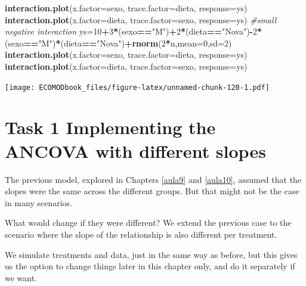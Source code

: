 \documentclass[
]{book}
\newenvironment{Shaded}{\begin{snugshade}}{\end{snugshade}}
\newcommand{\CommentTok}[1]{\textcolor[rgb]{0.56,0.35,0.01}{\textit{#1}}}
\newcommand{\DataTypeTok}[1]{\textcolor[rgb]{0.13,0.29,0.53}{#1}}
\newcommand{\DecValTok}[1]{\textcolor[rgb]{0.00,0.00,0.81}{#1}}
\newcommand{\KeywordTok}[1]{\textcolor[rgb]{0.13,0.29,0.53}{\textbf{#1}}}
\newcommand{\NormalTok}[1]{#1}
\newcommand{\OperatorTok}[1]{\textcolor[rgb]{0.81,0.36,0.00}{\textbf{#1}}}
\newcommand{\StringTok}[1]{\textcolor[rgb]{0.31,0.60,0.02}{#1}}
\begin{document}
\begin{Shaded}
\begin{Highlighting}[]
\KeywordTok{interaction.plot}\NormalTok{(}\DataTypeTok{x.factor=}\NormalTok{sexo, }\DataTypeTok{trace.factor=}\NormalTok{dieta, }\DataTypeTok{response=}\NormalTok{ys)}
\KeywordTok{interaction.plot}\NormalTok{(}\DataTypeTok{x.factor=}\NormalTok{dieta, }\DataTypeTok{trace.factor=}\NormalTok{sexo, }\DataTypeTok{response=}\NormalTok{ys)}
\CommentTok{#small negative interaction}
\NormalTok{ys=}\DecValTok{10}\OperatorTok{+}\DecValTok{3}\OperatorTok{*}\NormalTok{(sexo}\OperatorTok{==}\StringTok{"M"}\NormalTok{)}\OperatorTok{+}\DecValTok{2}\OperatorTok{*}\NormalTok{(dieta}\OperatorTok{==}\StringTok{"Nova"}\NormalTok{)}\OperatorTok{-}\DecValTok{2}\OperatorTok{*}\NormalTok{(sexo}\OperatorTok{==}\StringTok{"M"}\NormalTok{)}\OperatorTok{*}\NormalTok{(dieta}\OperatorTok{==}\StringTok{"Nova"}\NormalTok{)}\OperatorTok{+}\KeywordTok{rnorm}\NormalTok{(}\DecValTok{2}\OperatorTok{*}\NormalTok{n,}\DataTypeTok{mean=}\DecValTok{0}\NormalTok{,}\DataTypeTok{sd=}\DecValTok{2}\NormalTok{)}
\KeywordTok{interaction.plot}\NormalTok{(}\DataTypeTok{x.factor=}\NormalTok{sexo, }\DataTypeTok{trace.factor=}\NormalTok{dieta, }\DataTypeTok{response=}\NormalTok{ys)}
\KeywordTok{interaction.plot}\NormalTok{(}\DataTypeTok{x.factor=}\NormalTok{dieta, }\DataTypeTok{trace.factor=}\NormalTok{sexo, }\DataTypeTok{response=}\NormalTok{ys)}
\end{Highlighting}
\end{Shaded}

\texttt{[image: ECOMODbook\_files/figure-latex/unnamed-chunk-120-1.pdf]}

\hypertarget{task-1-implementing-the-ancova-with-different-slopes}{%
\section{Task 1 Implementing the ANCOVA with different slopes}\label{task-1-implementing-the-ancova-with-different-slopes}}

The previous model, explored in Chapters \ref{aula9} and \ref{aula10}, assumed that the slopes were the same across the different groups. But that might not be the case in many scenarios.

What would change if they were different? We extend the previous case to the scenario where the slope of the relationship is also different per treatment.

We simulate treatments and data, just in the same way as before, but this gives us the option to change things later in this chapter only, and do it separately if we want.
\end{document}
